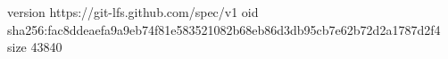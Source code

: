 version https://git-lfs.github.com/spec/v1
oid sha256:fac8ddeaefa9a9eb74f81e583521082b68eb86d3db95cb7e62b72d2a1787d2f4
size 43840
